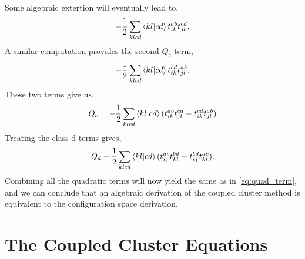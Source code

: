 Some algebraic extertion will eventually lead to,
\begin{equation}
    - \frac{1}{2} \sum_{klcd} \bra{kl} \ket{cd}
        t^{ab}_{ik} t^{cd}_{jl}.
\end{equation}
A similar computation provides the second $Q_c$ term,
\begin{equation}
    - \frac{1}{2} \sum_{klcd} \bra{kl} \ket{cd}
        t^{cd}_{ik} t^{ab}_{jl}.
\end{equation}
These two terms give us,
\begin{equation}
    Q_c = - \frac{1}{2} \sum_{klcd} \bra{kl} \ket{cd}
        (t^{ab}_{ik}t^{cd}_{jl} - t^{cd}_{ik}t^{ab}_{jl})
\end{equation}
Treating the class d terms gives,
\begin{equation}
    Q_d - \frac{1}{2} \sum_{klcd} \bra{kl} \ket{cd}
        (t^{ac}_{ij}t^{bd}_{kl} - t^{bd}_{ij}t^{ac}_{kl}).
\end{equation}
Combining all the quadratic terms will now yield the same as in 
\autoref{eq:quad_term}, and we can conclude that an algebraic 
derivation of the coupled cluster method is equivalent to the 
configuration space derivation.

\section{The Coupled Cluster Equations}

